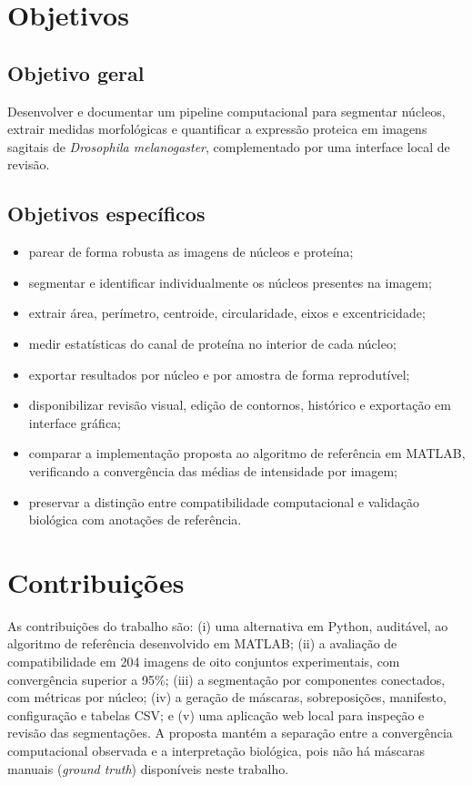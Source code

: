 \section{Objetivos}

\subsection{Objetivo geral}

Desenvolver e documentar um pipeline computacional para segmentar núcleos, extrair medidas morfológicas e quantificar a expressão proteica em imagens sagitais de \textit{Drosophila melanogaster}, complementado por uma interface local de revisão.

\subsection{Objetivos específicos}

\begin{itemize}
    \item parear de forma robusta as imagens de núcleos e proteína;
    \item segmentar e identificar individualmente os núcleos presentes na imagem;
    \item extrair área, perímetro, centroide, circularidade, eixos e excentricidade;
    \item medir estatísticas do canal de proteína no interior de cada núcleo;
    \item exportar resultados por núcleo e por amostra de forma reprodutível;
    \item disponibilizar revisão visual, edição de contornos, histórico e exportação em interface gráfica;
    \item comparar a implementação proposta ao algoritmo de referência em MATLAB, verificando a convergência das médias de intensidade por imagem;
    \item preservar a distinção entre compatibilidade computacional e validação biológica com anotações de referência.
\end{itemize}

\section{Contribuições}

As contribuições do trabalho são: (i) uma alternativa em Python, auditável, ao algoritmo de referência desenvolvido em MATLAB; (ii) a avaliação de compatibilidade em 204 imagens de oito conjuntos experimentais, com convergência superior a 95\%; (iii) a segmentação por componentes conectados, com métricas por núcleo; (iv) a geração de máscaras, sobreposições, manifesto, configuração e tabelas CSV; e (v) uma aplicação web local para inspeção e revisão das segmentações. A proposta mantém a separação entre a convergência computacional observada e a interpretação biológica, pois não há máscaras manuais (\textit{ground truth}) disponíveis neste trabalho.

